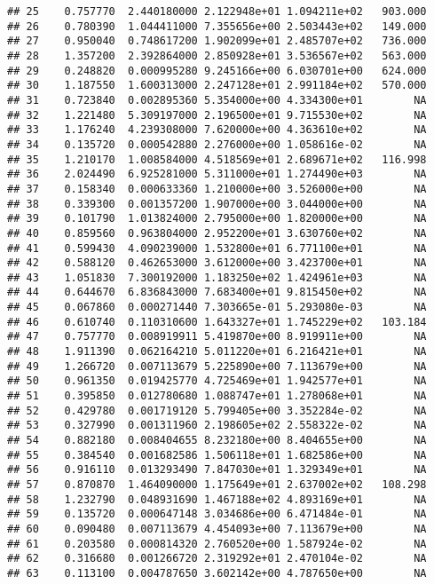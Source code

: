 \documentclass[
]{article}
\begin{document}
\begin{verbatim}
## 25    0.757770  2.440180000 2.122948e+01 1.094211e+02   903.000
## 26    0.780390  1.044411000 7.355656e+00 2.503443e+02   149.000
## 27    0.950040  0.748617200 1.902099e+01 2.485707e+02   736.000
## 28    1.357200  2.392864000 2.850928e+01 3.536567e+02   563.000
## 29    0.248820  0.000995280 9.245166e+00 6.030701e+00   624.000
## 30    1.187550  1.600313000 2.247128e+01 2.991184e+02   570.000
## 31    0.723840  0.002895360 5.354000e+00 4.334300e+01        NA
## 32    1.221480  5.309197000 2.196500e+01 9.715530e+02        NA
## 33    1.176240  4.239308000 7.620000e+00 4.363610e+02        NA
## 34    0.135720  0.000542880 2.276000e+00 1.058616e-02        NA
## 35    1.210170  1.008584000 4.518569e+01 2.689671e+02   116.998
## 36    2.024490  6.925281000 5.311000e+01 1.274490e+03        NA
## 37    0.158340  0.000633360 1.210000e+00 3.526000e+00        NA
## 38    0.339300  0.001357200 1.907000e+00 3.044000e+00        NA
## 39    0.101790  1.013824000 2.795000e+00 1.820000e+00        NA
## 40    0.859560  0.963804000 2.952200e+01 3.630760e+02        NA
## 41    0.599430  4.090239000 1.532800e+01 6.771100e+01        NA
## 42    0.588120  0.462653000 3.612000e+00 3.423700e+01        NA
## 43    1.051830  7.300192000 1.183250e+02 1.424961e+03        NA
## 44    0.644670  6.836843000 7.683400e+01 9.815450e+02        NA
## 45    0.067860  0.000271440 7.303665e-01 5.293080e-03        NA
## 46    0.610740  0.110310600 1.643327e+01 1.745229e+02   103.184
## 47    0.757770  0.008919911 5.419870e+00 8.919911e+00        NA
## 48    1.911390  0.062164210 5.011220e+01 6.216421e+01        NA
## 49    1.266720  0.007113679 5.225890e+00 7.113679e+00        NA
## 50    0.961350  0.019425770 4.725469e+01 1.942577e+01        NA
## 51    0.395850  0.012780680 1.088747e+01 1.278068e+01        NA
## 52    0.429780  0.001719120 5.799405e+00 3.352284e-02        NA
## 53    0.327990  0.001311960 2.198605e+02 2.558322e-02        NA
## 54    0.882180  0.008404655 8.232180e+00 8.404655e+00        NA
## 55    0.384540  0.001682586 1.506118e+01 1.682586e+00        NA
## 56    0.916110  0.013293490 7.847030e+01 1.329349e+01        NA
## 57    0.870870  1.464090000 1.175649e+01 2.637002e+02   108.298
## 58    1.232790  0.048931690 1.467188e+02 4.893169e+01        NA
## 59    0.135720  0.000647148 3.034686e+00 6.471484e-01        NA
## 60    0.090480  0.007113679 4.454093e+00 7.113679e+00        NA
## 61    0.203580  0.000814320 2.760520e+00 1.587924e-02        NA
## 62    0.316680  0.001266720 2.319292e+01 2.470104e-02        NA
## 63    0.113100  0.004787650 3.602142e+00 4.787650e+00        NA

\end{verbatim}
\end{document}
